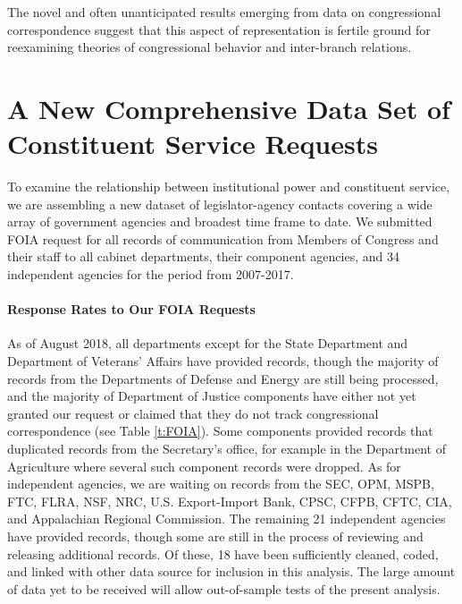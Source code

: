 \documentclass{article}
\begin{document}
The novel and often unanticipated results emerging from data on congressional correspondence suggest that this aspect of representation is fertile ground for reexamining theories of congressional behavior and inter-branch relations. 




\section{A New Comprehensive Data Set of Constituent Service Requests} 
To examine the relationship between institutional power and constituent service, we are assembling a new dataset of legislator-agency contacts covering a wide array of government agencies and broadest time frame to date. We submitted FOIA request for all records of communication from Members of Congress and their staff to all cabinet departments, their component agencies, and 34 independent agencies for the period from 2007-2017.

\paragraph{Response Rates to Our FOIA Requests} As of August 2018, all departments except for the State Department and Department of Veterans' Affairs have provided records, though the majority of records from the Departments of Defense and Energy are still being processed, and the majority of Department of Justice components have either not yet granted our request or claimed that they do not track congressional correspondence (see Table \ref{t:FOIA}). Some components provided records that duplicated records from the Secretary's office, for example in the Department of Agriculture where several such component records were dropped. As for independent agencies, we are waiting on records from the SEC, OPM, MSPB, FTC, FLRA, NSF, NRC, U.S. Export-Import Bank, CPSC, CFPB, CFTC, CIA, and Appalachian Regional Commission. The remaining 21 independent agencies have provided records, though some are still in the process of reviewing and releasing additional records. Of these, 18 have been sufficiently cleaned, coded, and linked with other data source for inclusion in this analysis. The large amount of data yet to be received will allow out-of-sample tests of the present analysis. 
\end{document}
